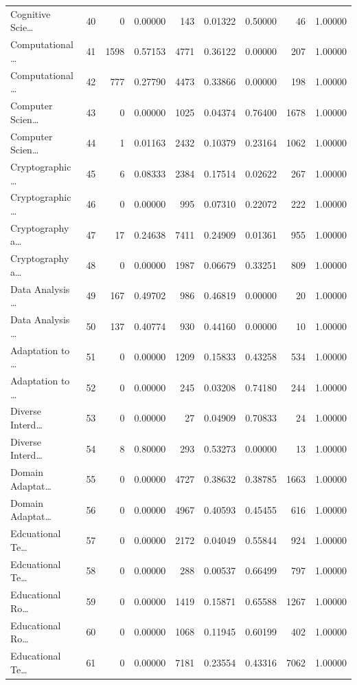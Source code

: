 \begin{table}
\begin{tabular}{lrrrrrrrr}
Cognitive Scie… & 40 & 0 & 0.00000 & 143 & 0.01322 & 0.50000 & 46 & 1.00000 \\
Computational … & 41 & 1598 & 0.57153 & 4771 & 0.36122 & 0.00000 & 207 & 1.00000 \\
Computational … & 42 & 777 & 0.27790 & 4473 & 0.33866 & 0.00000 & 198 & 1.00000 \\
Computer Scien… & 43 & 0 & 0.00000 & 1025 & 0.04374 & 0.76400 & 1678 & 1.00000 \\
Computer Scien… & 44 & 1 & 0.01163 & 2432 & 0.10379 & 0.23164 & 1062 & 1.00000 \\
Cryptographic … & 45 & 6 & 0.08333 & 2384 & 0.17514 & 0.02622 & 267 & 1.00000 \\
Cryptographic … & 46 & 0 & 0.00000 & 995 & 0.07310 & 0.22072 & 222 & 1.00000 \\
Cryptography a… & 47 & 17 & 0.24638 & 7411 & 0.24909 & 0.01361 & 955 & 1.00000 \\
Cryptography a… & 48 & 0 & 0.00000 & 1987 & 0.06679 & 0.33251 & 809 & 1.00000 \\
Data Analysis … & 49 & 167 & 0.49702 & 986 & 0.46819 & 0.00000 & 20 & 1.00000 \\
Data Analysis … & 50 & 137 & 0.40774 & 930 & 0.44160 & 0.00000 & 10 & 1.00000 \\
Adaptation to … & 51 & 0 & 0.00000 & 1209 & 0.15833 & 0.43258 & 534 & 1.00000 \\
Adaptation to … & 52 & 0 & 0.00000 & 245 & 0.03208 & 0.74180 & 244 & 1.00000 \\
Diverse Interd… & 53 & 0 & 0.00000 & 27 & 0.04909 & 0.70833 & 24 & 1.00000 \\
Diverse Interd… & 54 & 8 & 0.80000 & 293 & 0.53273 & 0.00000 & 13 & 1.00000 \\
Domain Adaptat… & 55 & 0 & 0.00000 & 4727 & 0.38632 & 0.38785 & 1663 & 1.00000 \\
Domain Adaptat… & 56 & 0 & 0.00000 & 4967 & 0.40593 & 0.45455 & 616 & 1.00000 \\
Edcuational Te… & 57 & 0 & 0.00000 & 2172 & 0.04049 & 0.55844 & 924 & 1.00000 \\
Edcuational Te… & 58 & 0 & 0.00000 & 288 & 0.00537 & 0.66499 & 797 & 1.00000 \\
Educational Ro… & 59 & 0 & 0.00000 & 1419 & 0.15871 & 0.65588 & 1267 & 1.00000 \\
Educational Ro… & 60 & 0 & 0.00000 & 1068 & 0.11945 & 0.60199 & 402 & 1.00000 \\
Educational Te… & 61 & 0 & 0.00000 & 7181 & 0.23554 & 0.43316 & 7062 & 1.00000 \\

\end{tabular}
\end{table}
